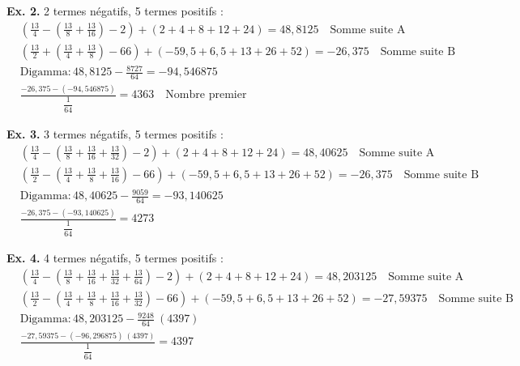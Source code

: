 \documentclass[11pt,a4paper]{article}
\begin{document}
\bigskip

\textbf{Ex. 2.} 2 termes négatifs, 5 termes positifs :
\begin{align*}
&\left(\frac{13}{4} - \left(\frac{13}{8} + \frac{13}{16}\right) - 2\right) + \left(2 + 4 + 8 + 12 + 24\right) = 48{,}8125 \quad \text{Somme suite A} \\
&\left(\frac{13}{2} + \left(\frac{13}{4} + \frac{13}{8}\right) - 66\right) + \left(-59{,}5 + 6{,}5 + 13 + 26 + 52\right) = -26{,}375 \quad \text{Somme suite B} \\
&\text{Digamma}: 48{,}8125 - \frac{8727}{64} = -94{,}546875 \\
&\frac{-26{,}375 - (-94{,}546875)}{\dfrac{1}{64}} = 4363 \quad \text{Nombre premier}
\end{align*}

\bigskip

\textbf{Ex. 3.} 3 termes négatifs, 5 termes positifs :
\begin{align*}
&\left(\frac{13}{4} - \left(\frac{13}{8} + \frac{13}{16} + \frac{13}{32}\right) - 2\right) + \left(2 + 4 + 8 + 12 + 24\right) = 48{,}40625 \quad \text{Somme suite A} \\
&\left(\frac{13}{2} - \left(\frac{13}{4} + \frac{13}{8} + \frac{13}{16}\right) - 66\right) + \left(-59{,}5 + 6{,}5 + 13 + 26 + 52\right) = -26{,}375 \quad \text{Somme suite B} \\
&\text{Digamma}: 48{,}40625 - \frac{9059}{64} = -93{,}140625 \\
&\frac{-26{,}375 - (-93{,}140625)}{\dfrac{1}{64}} = 4273
\end{align*}

\bigskip

\textbf{Ex. 4.} 4 termes négatifs, 5 termes positifs :
\begin{align*}
&\left(\frac{13}{4} - \left(\frac{13}{8} + \frac{13}{16} + \frac{13}{32} + \frac{13}{64}\right) - 2\right) + \left(2 + 4 + 8 + 12 + 24\right) = 48{,}203125 \quad \text{Somme suite A} \\
&\left(\frac{13}{2} - \left(\frac{13}{4} + \frac{13}{8} + \frac{13}{16} + \frac{13}{32}\right) - 66\right) + \left(-59{,}5 + 6{,}5 + 13 + 26 + 52\right) = -27{,}59375 \quad \text{Somme suite B} \\
&\text{Digamma}: 48{,}203125 - \frac{9248}{64} \ (4397) \\
&\frac{-27{,}59375 - (-96{,}296875) \ (4397)}{\dfrac{1}{64}} = 4397
\end{align*}

\bigskip
\end{document}

